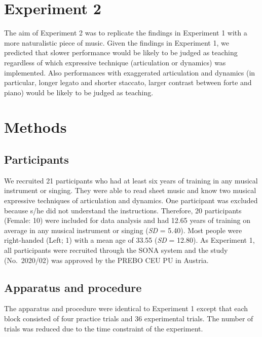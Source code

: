 \documentclass[
  man,floatsintext]{apa6}
\begin{document}
\hypertarget{experiment-2}{%
\section{Experiment 2}\label{experiment-2}}

The aim of Experiment 2 was to replicate the findings in Experiment 1 with a more naturalistic piece of music. Given the findings in Experiment 1, we predicted that slower performance would be likely to be judged as teaching regardless of which expressive technique (articulation or dynamics) was implemented. Also performances with exaggerated articulation and dynamics (in particular, longer legato and shorter staccato, larger contrast between forte and piano) would be likely to be judged as teaching.

\hypertarget{methods-1}{%
\section{Methods}\label{methods-1}}

\hypertarget{participants-1}{%
\subsection{Participants}\label{participants-1}}

We recruited 21 participants who had at least six years of training in any musical instrument or singing. They were able to read sheet music and know two musical expressive techniques of articulation and dynamics. One participant was excluded because s/he did not understand the instructions. Therefore, 20 participants (Female: 10) were included for data analysis and had 12.65 years of training on average in any musical instrument or singing (\emph{SD} = 5.40). Most people were right-handed (Left; 1) with a mean age of 33.55 (\emph{SD} = 12.80). As Experiment 1, all participants were recruited through the SONA system and the study (No.~2020/02) was approved by the PREBO CEU PU in Austria.

\hypertarget{apparatus-and-procedure}{%
\subsection{Apparatus and procedure}\label{apparatus-and-procedure}}

The apparatus and procedure were identical to Experiment 1 except that each block consisted of four practice trials and 36 experimental trials. The number of trials was reduced due to the time constraint of the experiment.
\end{document}
